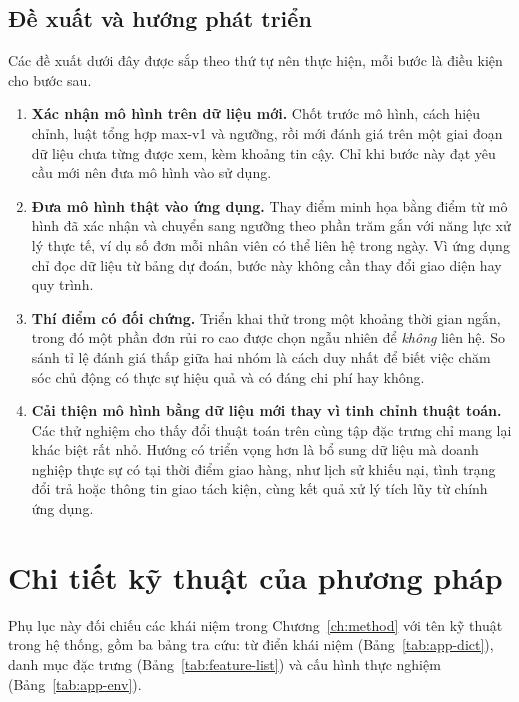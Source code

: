 \documentclass[12pt,a4paper]{report}
\begin{document}
\section{Đề xuất và hướng phát triển}\label{sec:future-work}

Các đề xuất dưới đây được sắp theo thứ tự nên thực hiện, mỗi bước là điều kiện cho bước sau.

\begin{enumerate}
  \item \textbf{Xác nhận mô hình trên dữ liệu mới.} Chốt trước mô hình, cách hiệu chỉnh, luật tổng hợp max-v1 và ngưỡng, rồi mới đánh giá trên một giai đoạn dữ liệu chưa từng được xem, kèm khoảng tin cậy. Chỉ khi bước này đạt yêu cầu mới nên đưa mô hình vào sử dụng.
  \item \textbf{Đưa mô hình thật vào ứng dụng.} Thay điểm minh họa bằng điểm từ mô hình đã xác nhận và chuyển sang ngưỡng theo phần trăm gắn với năng lực xử lý thực tế, ví dụ số đơn mỗi nhân viên có thể liên hệ trong ngày. Vì ứng dụng chỉ đọc dữ liệu từ bảng dự đoán, bước này không cần thay đổi giao diện hay quy trình.
  \item \textbf{Thí điểm có đối chứng.} Triển khai thử trong một khoảng thời gian ngắn, trong đó một phần đơn rủi ro cao được chọn ngẫu nhiên để \emph{không} liên hệ. So sánh tỉ lệ đánh giá thấp giữa hai nhóm là cách duy nhất để biết việc chăm sóc chủ động có thực sự hiệu quả và có đáng chi phí hay không.
  \item \textbf{Cải thiện mô hình bằng dữ liệu mới thay vì tinh chỉnh thuật toán.} Các thử nghiệm cho thấy đổi thuật toán trên cùng tập đặc trưng chỉ mang lại khác biệt rất nhỏ. Hướng có triển vọng hơn là bổ sung dữ liệu mà doanh nghiệp thực sự có tại thời điểm giao hàng, như lịch sử khiếu nại, tình trạng đổi trả hoặc thông tin giao tách kiện, cùng kết quả xử lý tích lũy từ chính ứng dụng.
\end{enumerate}

\printbibliography[heading=bibintoc,title={Tài liệu tham khảo}]
\appendix
\clearpage{}  %
\chapter{Chi tiết kỹ thuật của phương pháp}\label{app:tech}

Phụ lục này đối chiếu các khái niệm trong Chương~\ref{ch:method} với tên kỹ thuật trong hệ thống, gồm ba bảng tra cứu: từ điển khái niệm (Bảng~\ref{tab:app-dict}), danh mục đặc trưng (Bảng~\ref{tab:feature-list}) và cấu hình thực nghiệm (Bảng~\ref{tab:app-env}).
\end{document}
